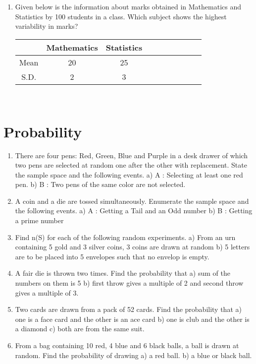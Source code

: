 \documentclass[17pt]{extarticle}
\begin{document}
\begin{multicols}{2}
\begin{enumerate}
\item Given below is the information about marks obtained in Mathematics and Statistics by 100 students in a class. Which subject shows
the highest variability in marks?
\begin{tabular}{|c|*{9}{c|}}
\hline  & Mathematics & Statistics \\
\hline Mean & 20 & 25  \\
\hline S.D. & 2 & 3  \\
\hline
\end{tabular}\\

\end{enumerate} 


\section{Probability}
\noindent
\begin{enumerate}
 \item There are four pens: Red, Green, Blue and
Purple in a desk drawer of which two pens
are selected at random one after the other
with replacement. State the sample space
and the following events. a)	 A : Selecting at least one red pen. b)	 B : Two pens of the same color are not
selected.

\item A coin and a die are tossed simultaneously.
Enumerate the sample space and the
following events. a)	 A : Getting a Tail and an Odd number b)	 B : Getting a prime number
	
\item	 Find n(S) for each of the following random
experiments.  a) From an urn containing 5 gold and 3
silver coins, 3 coins are drawn at random b)	 5 letters are to be placed into 5 envelopes
such that no envelop is empty.

\item A fair die is thrown two times. Find the
probability that a)	 sum of the numbers on them is 5
b)	 first throw gives a multiple of 2 and
second throw gives a multiple of 3.
\item Two cards are drawn from a pack of 52
cards. Find the probability that a)	 one is a face card and the other is an ace card
b)	 one is club and the other is a diamond
c)	 both are from the same suit.
\item From a bag containing 10 red, 4 blue and
6 black balls, a ball is drawn at random. Find
the probability of drawing
a)	 a red ball. b)	 a blue or black ball.


\end{enumerate}
\end{multicols}
\end{document}
